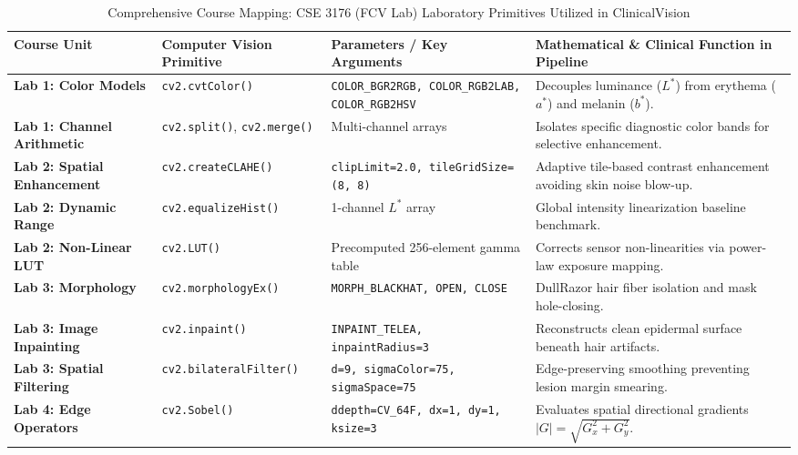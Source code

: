 \documentclass[conference]{IEEEtran}
\begin{document}
\begin{table}[t]
\caption{Comprehensive Course Mapping: CSE 3176 (FCV Lab) Laboratory Primitives Utilized in ClinicalVision}
\label{tab:syllabus}
\centering
\footnotesize %
\renewcommand{\arraystretch}{1.15} %
\begin{tabularx}{\textwidth}{@{}L{2.8cm} L{3.5cm} L{4.5cm} Y@{}}
\toprule
\textbf{Course Unit} & \textbf{Computer Vision Primitive} & \textbf{Parameters / Key Arguments} & \textbf{Mathematical \& Clinical Function in Pipeline} \\
\midrule
\textbf{Lab 1: Color Models} & \texttt{cv2.cvtColor()} & \texttt{COLOR\_BGR2RGB, COLOR\_RGB2LAB, COLOR\_RGB2HSV} & Decouples luminance ($L^*$) from erythema ($a^*$) and melanin ($b^*$). \\
\textbf{Lab 1: Channel Arithmetic} & \texttt{cv2.split()}, \texttt{cv2.merge()} & Multi-channel arrays & Isolates specific diagnostic color bands for selective enhancement. \\
\textbf{Lab 2: Spatial Enhancement} & \texttt{cv2.createCLAHE()} & \texttt{clipLimit=2.0, tileGridSize=(8, 8)} & Adaptive tile-based contrast enhancement avoiding skin noise blow-up. \\
\textbf{Lab 2: Dynamic Range} & \texttt{cv2.equalizeHist()} & 1-channel $L^*$ array & Global intensity linearization baseline benchmark. \\
\textbf{Lab 2: Non-Linear LUT} & \texttt{cv2.LUT()} & Precomputed 256-element gamma table & Corrects sensor non-linearities via power-law exposure mapping. \\
\textbf{Lab 3: Morphology} & \texttt{cv2.morphologyEx()} & \texttt{MORPH\_BLACKHAT, OPEN, CLOSE} & DullRazor hair fiber isolation and mask hole-closing. \\
\textbf{Lab 3: Image Inpainting} & \texttt{cv2.inpaint()} & \texttt{INPAINT\_TELEA, inpaintRadius=3} & Reconstructs clean epidermal surface beneath hair artifacts. \\
\textbf{Lab 3: Spatial Filtering} & \texttt{cv2.bilateralFilter()} & \texttt{d=9, sigmaColor=75, sigmaSpace=75} & Edge-preserving smoothing preventing lesion margin smearing. \\
\textbf{Lab 4: Edge Operators} & \texttt{cv2.Sobel()} & \texttt{ddepth=CV\_64F, dx=1, dy=1, ksize=3} & Evaluates spatial directional gradients $|G| = \sqrt{G_x^2 + G_y^2}$. \\

\end{tabularx}
\end{table}
\end{document}
